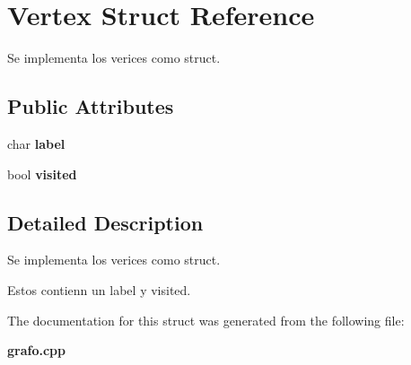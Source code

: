 \section{Vertex Struct Reference}
\label{struct_vertex}


Se implementa los verices como struct.  


\subsection*{Public Attributes}
\begin{DoxyCompactItemize}
\item 
char {\bfseries label}\label{struct_vertex_aee52569b393c4b34161e0a75011f2be4}

\item 
bool {\bfseries visited}\label{struct_vertex_aaef9f7de91b4b8f1752d391a1aae9c2e}

\end{DoxyCompactItemize}


\subsection{Detailed Description}
Se implementa los verices como struct. 

Estos contienn un label y visited. 

The documentation for this struct was generated from the following file\+:\begin{DoxyCompactItemize}
\item 
{\bf grafo.\+cpp}\end{DoxyCompactItemize}
